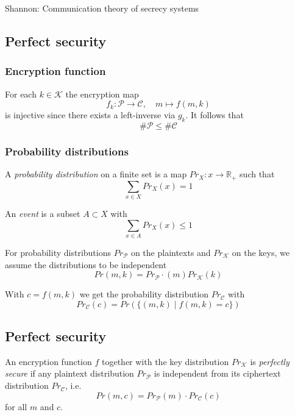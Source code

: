 \documentclass[a4paper]{scrartcl}
\newcommand\R{\mathbb R}
\newcommand\cP{\mathcal P}
\newcommand\cC{\mathcal C}
\newcommand\cK{\mathcal K}
\begin{document}
Shannon: Communication theory of secrecy systems

\subsection{Perfect security}

\subsubsection{Encryption function}

For each $k\in\cK$ the encryption map
\[f_k:\cP\rightarrow\cC,\quad m\mapsto f(m,k)\]
is injective since there exists a left-inverse via $g_k$. It follows that
\[\#\cP\leq\#\cC\]

\subsubsection{Probability distributions}

A \textit{probability distribution} on a finite set is a map $\mathit{Pr}_X:x\rightarrow \R_+$
such that \[\sum_{x\in X}\mathit{Pr}_X(x)=1\]

An \textit{event} is a subset $A\subset X$ with
\[\sum_{x\in A}\mathit{Pr}_X(x)\leq1\]

For probability distributions $\mathit{Pr}_\cP$ on the plaintexts and $\mathit{Pr}_\cK$ on the
keys, we assume the distributions to be independent
\[\mathit{Pr}(m,k) = \mathit{Pr}_\cP\cdot(m)\mathit{Pr}_\cK(k)\]

With $c=f(m,k)$ we get the probability distribution $\mathit{Pr}_\cC$ with
\[\mathit{Pr}_\cC(c)=\mathit{Pr}(\{(m,k)\mid f(m,k)=c\})\]

\subsection{Perfect security}

An encryption function $f$ together with the key distribution $\mathit{Pr}_\cK$ is
\textit{perfectly secure} if any plaintext distribution $\mathit{Pr}_\cP$ is
independent from its ciphertext distribution $\mathit{Pr}_\cC$, i.e.
\[\mathit{Pr}(m,c)=\mathit{Pr}_\cP(m)\cdot\mathit{Pr}_\cC(c)\]
for all $m$ and $c$.
\end{document}
